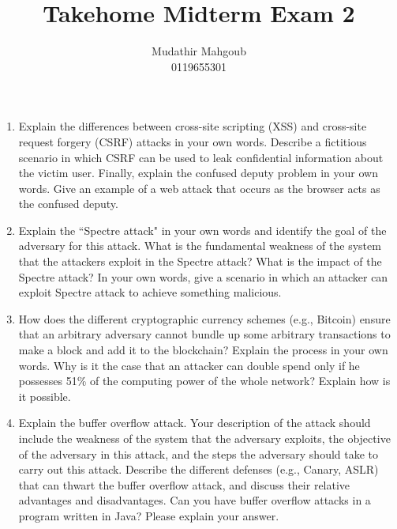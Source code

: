 \documentclass[12pt,a4paper]{article}
\author{Mudathir Mahgoub \\ 0119655301}
\title{Takehome Midterm Exam 2}
\begin{document}
\maketitle


\begin{enumerate}

\item Explain the differences between cross-site scripting (XSS) and cross-site
request forgery (CSRF) attacks in your own words. Describe a fictitious scenario in
which CSRF can be used to leak confidential information about the victim user. Finally,
explain the confused deputy problem in your own words. Give an example of a web
attack that occurs as the browser acts as the confused deputy.

\color{blue}

\color{black}

\item Explain the ``Spectre attack" in your own words and identify the goal of
the adversary for this attack. What is the fundamental weakness of the system that
the attackers exploit in the Spectre attack? What is the impact of the Spectre attack?
In your own words, give a scenario in which an attacker can exploit Spectre attack to
achieve something malicious.


\color{blue}

\color{black}

\item How does the different cryptographic currency schemes (e.g., Bitcoin) ensure
that an arbitrary adversary cannot bundle up some arbitrary transactions to make a
block and add it to the blockchain? Explain the process in your own words. Why is it
the case that an attacker can double spend only if he possesses 51\% of the computing
power of the whole network? Explain how is it possible.


\color{blue}


\color{black}

\item Explain the buffer overflow attack. Your description of the attack should
include the weakness of the system that the adversary exploits, the objective of the
adversary in this attack, and the steps the adversary should take to carry out this
attack. Describe the different defenses (e.g., Canary, ASLR) that can thwart the buffer overflow attack, and discuss their relative advantages and disadvantages. Can you have buffer overflow attacks in a program written in Java? Please explain your answer.



\end{enumerate}
\end{document}
